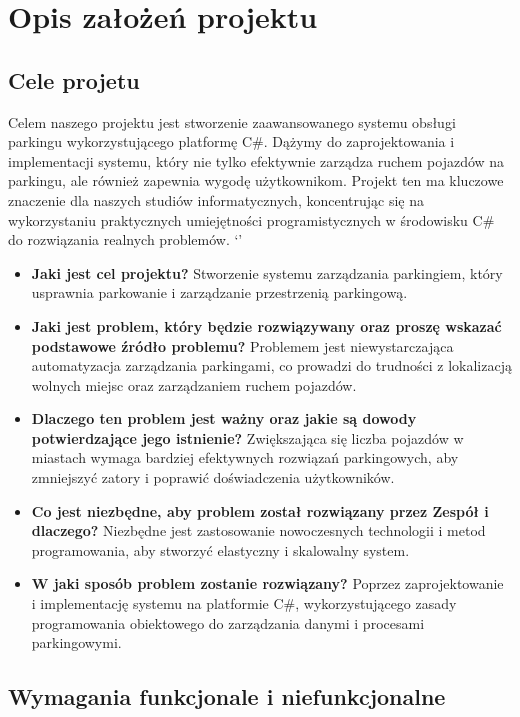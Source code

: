 \chapter{Opis założeń projektu}
\section{Cele projetu}

Celem naszego projektu jest stworzenie zaawansowanego systemu obsługi parkingu wykorzystującego platformę C\#. Dążymy do zaprojektowania i implementacji systemu, który nie tylko efektywnie zarządza ruchem pojazdów na parkingu, ale również zapewnia wygodę użytkownikom. Projekt ten ma kluczowe znaczenie dla naszych studiów informatycznych, koncentrując się na wykorzystaniu praktycznych umiejętności programistycznych w środowisku C\# do rozwiązania realnych problemów.
`'
\begin{itemize}
    \item \textbf{Jaki jest cel projektu?} Stworzenie systemu zarządzania parkingiem, który usprawnia parkowanie i zarządzanie przestrzenią parkingową.
    \item \textbf{Jaki jest problem, który będzie rozwiązywany oraz proszę wskazać podstawowe źródło problemu?} Problemem jest niewystarczająca automatyzacja zarządzania parkingami, co prowadzi do trudności z lokalizacją wolnych miejsc oraz zarządzaniem ruchem pojazdów.
    \item \textbf{Dlaczego ten problem jest ważny oraz jakie są dowody potwierdzające jego istnienie?} Zwiększająca się liczba pojazdów w miastach wymaga bardziej efektywnych rozwiązań parkingowych, aby zmniejszyć zatory i poprawić doświadczenia użytkowników.
    \item \textbf{Co jest niezbędne, aby problem został rozwiązany przez Zespół i dlaczego?} Niezbędne jest zastosowanie nowoczesnych technologii i metod programowania, aby stworzyć elastyczny i skalowalny system.
    \item \textbf{W jaki sposób problem zostanie rozwiązany?} Poprzez zaprojektowanie i implementację systemu na platformie C\#, wykorzystującego zasady programowania obiektowego do zarządzania danymi i procesami parkingowymi.
\end{itemize}

\section{Wymagania funkcjonale i niefunkcjonalne}

